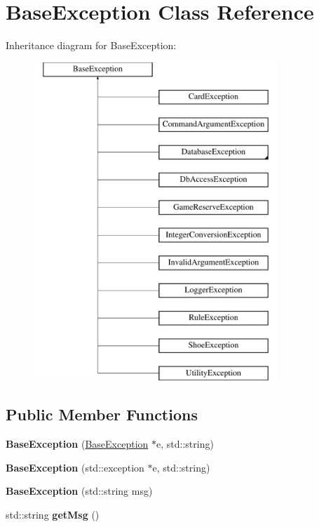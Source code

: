 \hypertarget{classBaseException}{
\section{\-Base\-Exception \-Class \-Reference}
\label{classBaseException}
}
\-Inheritance diagram for \-Base\-Exception\-:\begin{figure}[H]
\begin{center}
\leavevmode
\includegraphics[height=12.000000cm]{classBaseException}
\end{center}
\end{figure}
\subsection*{\-Public \-Member \-Functions}
\begin{DoxyCompactItemize}
\item 
\hypertarget{classBaseException_a1ffe60a4405ea55088f1ceb10997f034}{
{\bfseries \-Base\-Exception} (\hyperlink{classBaseException}{\-Base\-Exception} $\ast$e, std\-::string)}
\label{classBaseException_a1ffe60a4405ea55088f1ceb10997f034}

\item 
\hypertarget{classBaseException_a70b9c097d5a1d2e52eb6fc6f50cf581b}{
{\bfseries \-Base\-Exception} (std\-::exception $\ast$e, std\-::string)}
\label{classBaseException_a70b9c097d5a1d2e52eb6fc6f50cf581b}

\item 
\hypertarget{classBaseException_a7d38ab8844d208a73fc5552557705949}{
{\bfseries \-Base\-Exception} (std\-::string msg)}
\label{classBaseException_a7d38ab8844d208a73fc5552557705949}

\item 
\hypertarget{classBaseException_af86074159f2c4d22806b08f11da860a3}{
std\-::string {\bfseries get\-Msg} ()}
\label{classBaseException_af86074159f2c4d22806b08f11da860a3}

\end{DoxyCompactItemize}


